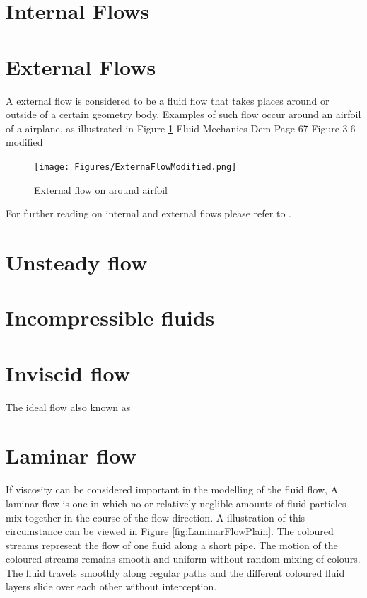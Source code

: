 \section{Internal Flows}

\section{External Flows}
A external flow is considered to be a fluid flow that takes places around or outside of a certain geometry body. Examples of such flow occur around
an airfoil of a airplane, as illustrated in Figure \ref{fig:ExternalFlowAirfoil}  Fluid Mechanics Dem Page 67 Figure 3.6 modified


\begin{figure}[htp]
\centering
\texttt{[image: Figures/ExternaFlowModified.png]}
\caption{External flow on around airfoil}
\label{fig:ExternalFlowAirfoil}
\end{figure}

For further reading on internal and external flows please refer to \cite{Hirsch2007}.

\section{Unsteady flow}


\section{Incompressible fluids}
\label{sec:incompress_fluid}



\section{Inviscid flow}
\label{sec:invisicid_flow}
The ideal flow also known as



\section{Laminar flow}

If viscosity can be considered important in the modelling of the fluid flow, 
A laminar flow is one in which no or relatively neglible amounts of fluid particles mix together in the course of the flow direction. A illustration
of this circumstance can be viewed in Figure \ref{fig:LaminarFlowPlain}. The coloured streams represent the flow of one fluid along a short pipe. The motion
of the coloured streams remains smooth and uniform without random mixing of colours. The fluid travels smoothly along regular paths and the different coloured
fluid layers slide over each other without interception.


